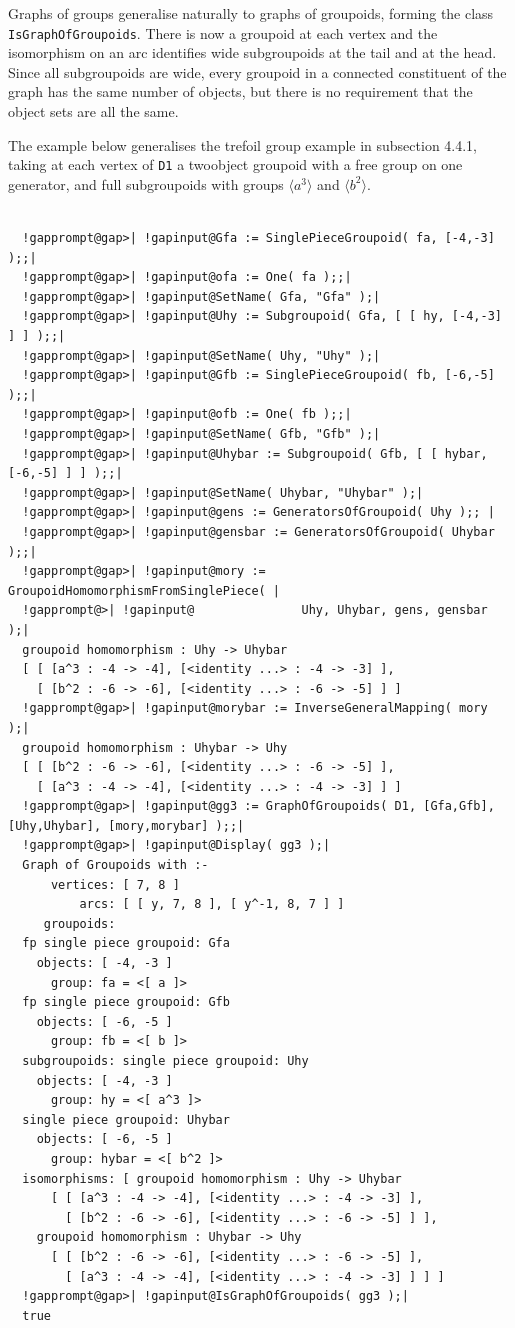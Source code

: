 \documentclass[a4paper,11pt]{report}
\begin{document}
{{{ Graphs of groups generalise naturally to graphs of groupoids, forming the
class \texttt{IsGraphOfGroupoids}. There is now a groupoid at each vertex and the isomorphism on an arc
identifies wide subgroupoids at the tail and at the head. Since all
subgroupoids are wide, every groupoid in a connected constituent of the graph
has the same number of objects, but there is no requirement that the object
sets are all the same. 

 The example below generalises the trefoil group example in subsection 4.4.1,
taking at each vertex of \texttt{D1} a two\texttt{}object groupoid with a free group on one generator,
and full subgroupoids with groups $\langle a^3 \rangle$ and $\langle b^2 \rangle$. 

 }

 
\begin{Verbatim}[commandchars=!@|,fontsize=\small,frame=single,label=Example]
  
  !gapprompt@gap>| !gapinput@Gfa := SinglePieceGroupoid( fa, [-4,-3] );;|
  !gapprompt@gap>| !gapinput@ofa := One( fa );;|
  !gapprompt@gap>| !gapinput@SetName( Gfa, "Gfa" );|
  !gapprompt@gap>| !gapinput@Uhy := Subgroupoid( Gfa, [ [ hy, [-4,-3] ] ] );;|
  !gapprompt@gap>| !gapinput@SetName( Uhy, "Uhy" );|
  !gapprompt@gap>| !gapinput@Gfb := SinglePieceGroupoid( fb, [-6,-5] );;|
  !gapprompt@gap>| !gapinput@ofb := One( fb );;|
  !gapprompt@gap>| !gapinput@SetName( Gfb, "Gfb" );|
  !gapprompt@gap>| !gapinput@Uhybar := Subgroupoid( Gfb, [ [ hybar, [-6,-5] ] ] );;|
  !gapprompt@gap>| !gapinput@SetName( Uhybar, "Uhybar" );|
  !gapprompt@gap>| !gapinput@gens := GeneratorsOfGroupoid( Uhy );; |
  !gapprompt@gap>| !gapinput@gensbar := GeneratorsOfGroupoid( Uhybar );;|
  !gapprompt@gap>| !gapinput@mory := GroupoidHomomorphismFromSinglePiece( |
  !gapprompt@>| !gapinput@               Uhy, Uhybar, gens, gensbar );|
  groupoid homomorphism : Uhy -> Uhybar
  [ [ [a^3 : -4 -> -4], [<identity ...> : -4 -> -3] ], 
    [ [b^2 : -6 -> -6], [<identity ...> : -6 -> -5] ] ]
  !gapprompt@gap>| !gapinput@morybar := InverseGeneralMapping( mory );|
  groupoid homomorphism : Uhybar -> Uhy
  [ [ [b^2 : -6 -> -6], [<identity ...> : -6 -> -5] ], 
    [ [a^3 : -4 -> -4], [<identity ...> : -4 -> -3] ] ]
  !gapprompt@gap>| !gapinput@gg3 := GraphOfGroupoids( D1, [Gfa,Gfb], [Uhy,Uhybar], [mory,morybar] );;|
  !gapprompt@gap>| !gapinput@Display( gg3 );|
  Graph of Groupoids with :- 
      vertices: [ 7, 8 ]
          arcs: [ [ y, 7, 8 ], [ y^-1, 8, 7 ] ]
     groupoids: 
  fp single piece groupoid: Gfa
    objects: [ -4, -3 ]
      group: fa = <[ a ]>
  fp single piece groupoid: Gfb
    objects: [ -6, -5 ]
      group: fb = <[ b ]>
  subgroupoids: single piece groupoid: Uhy
    objects: [ -4, -3 ]
      group: hy = <[ a^3 ]>
  single piece groupoid: Uhybar
    objects: [ -6, -5 ]
      group: hybar = <[ b^2 ]>
  isomorphisms: [ groupoid homomorphism : Uhy -> Uhybar
      [ [ [a^3 : -4 -> -4], [<identity ...> : -4 -> -3] ], 
        [ [b^2 : -6 -> -6], [<identity ...> : -6 -> -5] ] ], 
    groupoid homomorphism : Uhybar -> Uhy
      [ [ [b^2 : -6 -> -6], [<identity ...> : -6 -> -5] ], 
        [ [a^3 : -4 -> -4], [<identity ...> : -4 -> -3] ] ] ]
  !gapprompt@gap>| !gapinput@IsGraphOfGroupoids( gg3 );|
  true
  

\end{Verbatim}}}
\end{document}
